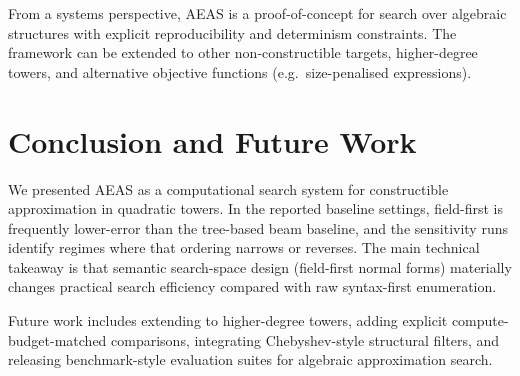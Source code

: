 \documentclass[11pt]{article}
\begin{document}
From a systems perspective, AEAS is a proof-of-concept for search over algebraic structures with explicit reproducibility and determinism constraints.
The framework can be extended to other non-constructible targets, higher-degree towers, and alternative objective functions (e.g.\ size-penalised expressions).

\section{Conclusion and Future Work}

We presented AEAS as a computational search system for constructible approximation in quadratic towers.
In the reported baseline settings, field-first is frequently lower-error than the tree-based beam baseline, and the sensitivity runs identify regimes where that ordering narrows or reverses.
The main technical takeaway is that semantic search-space design (field-first normal forms) materially changes practical search efficiency compared with raw syntax-first enumeration.

Future work includes extending to higher-degree towers, adding explicit compute-budget-matched comparisons, integrating Chebyshev-style structural filters, and releasing benchmark-style evaluation suites for algebraic approximation search.
\end{document}
